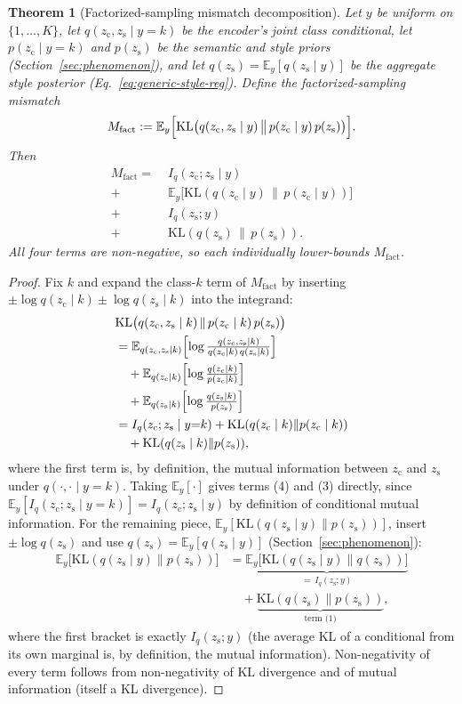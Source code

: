 \documentclass[10pt,letterpaper]{article}
\newcommand{\zc}{z_{\mathrm{c}}}
\newcommand{\zs}{z_{\mathrm{s}}}
\newcommand{\KL}{\mathrm{KL}}
\newtheorem{theorem}{Theorem}
\begin{document}
\begin{theorem}[Factorized-sampling mismatch decomposition]
\label{thm:decomposition}
Let $y$ be uniform on $\{1,\dots,K\}$, let $q(\zc,\zs\mid y{=}k)$ be the
encoder's joint class conditional, let $p(\zc\mid y{=}k)$ and $p(\zs)$ be
the semantic and style priors (Section~\ref{sec:phenomenon}), and let
$q(\zs)=\mathbb E_y[q(\zs\mid y)]$ be the aggregate style posterior
(Eq.~\ref{eq:generic-style-reg}). Define the factorized-sampling mismatch
\[
M_{\mathrm{fact}} := \mathbb E_y\Bigl[\KL\bigl(q(\zc,\zs\mid y)\,\big\|\,
p(\zc\mid y)\,p(\zs)\bigr)\Bigr].
\]
Then
\begin{align}
M_{\mathrm{fact}} = \;
  & I_q(\zc;\zs\mid y) \tag{term 4}\\
  + \; & \mathbb E_y\bigl[\KL(q(\zc\mid y)\,\|\,p(\zc\mid y))\bigr] \tag{term 3}\\
  + \; & I_q(\zs;y) \tag{term 2}\\
  + \; & \KL(q(\zs)\,\|\,p(\zs)). \tag{term 1}
\end{align}
All four terms are non-negative, so each individually lower-bounds
$M_{\mathrm{fact}}$.
\end{theorem}

\begin{proof}
Fix $k$ and expand the class-$k$ term of $M_{\mathrm{fact}}$ by inserting
$\pm\log q(\zc\mid k)\pm\log q(\zs\mid k)$ into the integrand:
\begin{align*}
&\KL\bigl(q(\zc,\zs\mid k)\,\|\,p(\zc\mid k)\,p(\zs)\bigr) \\
&= \mathbb E_{q(\zc,\zs\mid k)}\Bigl[\log\tfrac{q(\zc,\zs\mid k)}{q(\zc\mid k)\,q(\zs\mid k)}\Bigr] \\
&\quad + \mathbb E_{q(\zc\mid k)}\Bigl[\log\tfrac{q(\zc\mid k)}{p(\zc\mid k)}\Bigr] \\
&\quad + \mathbb E_{q(\zs\mid k)}\Bigl[\log\tfrac{q(\zs\mid k)}{p(\zs)}\Bigr] \\
&= I_q(\zc;\zs\mid y{=}k) + \KL(q(\zc\mid k)\|p(\zc\mid k)) \\
&\quad + \KL(q(\zs\mid k)\|p(\zs)),
\end{align*}
where the first term is, by definition, the mutual information between
$\zc$ and $\zs$ under $q(\cdot,\cdot\mid y{=}k)$. Taking $\mathbb E_y[\cdot]$
gives terms (4) and (3) directly, since $\mathbb
E_y[I_q(\zc;\zs\mid y{=}k)]=I_q(\zc;\zs\mid y)$ by definition of
conditional mutual information. For the remaining piece,
$\mathbb E_y[\KL(q(\zs\mid y)\|p(\zs))]$, insert $\pm\log q(\zs)$ and use
$q(\zs)=\mathbb E_y[q(\zs\mid y)]$ (Section~\ref{sec:phenomenon}):
\begin{align*}
\mathbb E_y\bigl[\KL(q(\zs\mid y)\|p(\zs))\bigr]
 &= \underbrace{\mathbb E_y\bigl[\KL(q(\zs\mid y)\|q(\zs))\bigr]}_{=\,I_q(\zs;y)} \\
 &\quad + \underbrace{\KL(q(\zs)\|p(\zs))}_{\text{term (1)}},
\end{align*}
where the first bracket is exactly $I_q(\zs;y)$ (the average KL of a
conditional from its own marginal is, by definition, the mutual
information). Non-negativity of every term follows from non-negativity of
KL divergence and of mutual information (itself a KL divergence).
\end{proof}
\end{document}
